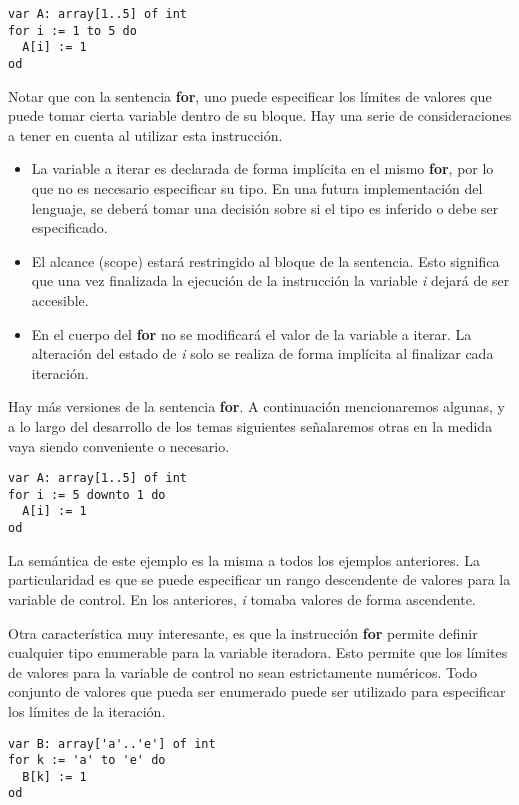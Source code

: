 \documentclass{article}
\begin{document}
\begin{lstlisting}
var A: array[1..5] of int
for i := 1 to 5 do
  A[i] := 1
od
\end{lstlisting}

Notar que con la sentencia \textbf{for}, uno puede especificar los límites de valores que puede tomar cierta variable dentro de su bloque.
Hay una serie de consideraciones a tener en cuenta al utilizar esta instrucción.

\begin{itemize}
\item La variable a iterar es declarada de forma implícita en el mismo \textbf{for}, por lo que no es necesario especificar su tipo.
En una futura implementación del lenguaje, se deberá tomar una decisión sobre si el tipo es inferido o debe ser especificado.
\item El alcance (scope) estará restringido al bloque de la sentencia.
Esto significa que una vez finalizada la ejecución de la instrucción la variable \textit{i} dejará de ser accesible.
\item En el cuerpo del \textbf{for} no se modificará el valor de la variable a iterar.
La alteración del estado de \textit{i} solo se realiza de forma implícita al finalizar cada iteración.
\end{itemize}

Hay más versiones de la sentencia \textbf{for}.
A continuación mencionaremos algunas, y a lo largo del desarrollo de los temas siguientes señalaremos otras en la medida vaya siendo conveniente o necesario.

\begin{lstlisting}
var A: array[1..5] of int
for i := 5 downto 1 do
  A[i] := 1
od
\end{lstlisting}

La semántica de este ejemplo es la misma a todos los ejemplos anteriores.
La particularidad es que se puede especificar un rango descendente de valores para la variable de control.
En los anteriores, \textit{i} tomaba valores de forma ascendente.

Otra característica muy interesante, es que la instrucción \textbf{for} permite definir cualquier tipo enumerable para la variable iteradora.
Esto permite que los límites de valores para la variable de control no sean estrictamente numéricos.
Todo conjunto de valores que pueda ser enumerado puede ser utilizado para especificar los límites de la iteración.

\begin{lstlisting}
var B: array['a'..'e'] of int
for k := 'a' to 'e' do
  B[k] := 1
od
\end{lstlisting}
\end{document}
